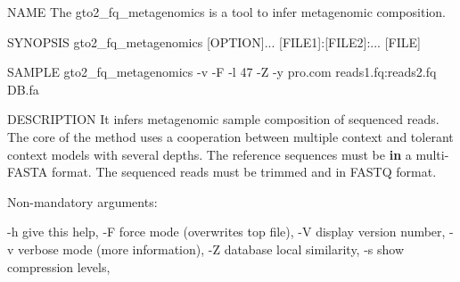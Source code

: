 \documentclass[11pt,]{krantz}
\newenvironment{Shaded}{\begin{snugshade}}{\end{snugshade}}
\newcommand{\KeywordTok}[1]{\textcolor[rgb]{0.27,0.27,0.27}{\textbf{#1}}}
\newcommand{\ExtensionTok}[1]{#1}
\newcommand{\NormalTok}[1]{#1}
\begin{document}
\begin{Shaded}
\begin{Highlighting}[]
\ExtensionTok{NAME}                                                                     
      \ExtensionTok{The}\NormalTok{ gto2_fq_metagenomics is a tool to infer }
      \ExtensionTok{metagenomic}\NormalTok{ composition.            }
                                                                         
\ExtensionTok{SYNOPSIS}                                                                 
      \ExtensionTok{gto2_fq_metagenomics}\NormalTok{ [OPTION]... [FILE1]:[FILE2]:... }
\NormalTok{      [}\ExtensionTok{FILE}\NormalTok{]                      }
                                                                         
\ExtensionTok{SAMPLE}                                                                   
      \ExtensionTok{gto2_fq_metagenomics}\NormalTok{ -v -F -l 47 -Z -y pro.com }
      \ExtensionTok{reads1.fq}\NormalTok{:reads2.fq DB.fa         }
                                                                         
\ExtensionTok{DESCRIPTION}                                                              
      \ExtensionTok{It}\NormalTok{ infers metagenomic sample composition of sequenced }
      \ExtensionTok{reads.}\NormalTok{ The core of the method uses a cooperation }
      \ExtensionTok{between}\NormalTok{ multiple context and tolerant context models }
      \ExtensionTok{with}\NormalTok{ several depths. The reference sequences must be }
      \KeywordTok{in} \ExtensionTok{a}\NormalTok{ multi-FASTA format. The sequenced reads must be }
      \ExtensionTok{trimmed}\NormalTok{ and in FASTQ format.           }
                                                                         
      \ExtensionTok{Non-mandatory}\NormalTok{ arguments:                                           }
                                                                         
      \ExtensionTok{-h}\NormalTok{                   give this help,                               }
      \ExtensionTok{-F}\NormalTok{                   force mode (overwrites top file),             }
      \ExtensionTok{-V}\NormalTok{                   display version number,                       }
      \ExtensionTok{-v}\NormalTok{                   verbose mode (more information),              }
      \ExtensionTok{-Z}\NormalTok{                   database local similarity,                    }
      \ExtensionTok{-s}\NormalTok{                   show compression levels,                      }
                                                                         

\end{Highlighting}
\end{Shaded}
\end{document}
